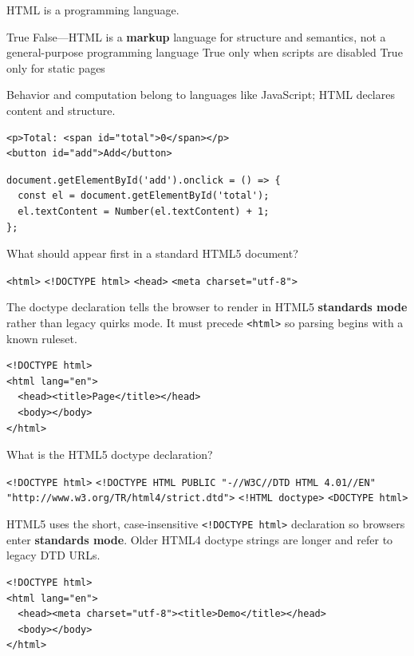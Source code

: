 \newpage


\question[4]
HTML is a programming language.
\begin{choices}
  \choice True
  \CorrectChoice False---HTML is a \textbf{markup} language for structure and semantics, not a general-purpose programming language
  \choice True only when scripts are disabled
  \choice True only for static pages
\end{choices}
\begin{solution}
  Behavior and computation belong to languages like JavaScript; HTML declares content and structure.
\begin{lstlisting}[style=htmlinline]
<p>Total: <span id="total">0</span></p>
<button id="add">Add</button>
\end{lstlisting}
\begin{lstlisting}[style=js]
document.getElementById('add').onclick = () => {
  const el = document.getElementById('total');
  el.textContent = Number(el.textContent) + 1;
};
\end{lstlisting}
\end{solution}

\question[4]
What should appear first in a standard HTML5 document?
\begin{choices}
  \choice \texttt{<html>}
  \CorrectChoice \texttt{<!DOCTYPE html>}
  \choice \texttt{<head>}
  \choice \texttt{<meta charset="utf-8">}
\end{choices}
\begin{solution}
  The doctype declaration tells the browser to render in HTML5 \textbf{standards mode} rather than legacy quirks mode. It must precede \texttt{<html>} so parsing begins with a known ruleset.
\begin{lstlisting}[style=htmlinline]
<!DOCTYPE html>
<html lang="en">
  <head><title>Page</title></head>
  <body></body>
</html>
\end{lstlisting}
\end{solution}

\question[4]
What is the HTML5 doctype declaration?
\begin{choices}
  \CorrectChoice \texttt{<!DOCTYPE html>}
  \choice \texttt{<!DOCTYPE HTML PUBLIC "-//W3C//DTD HTML 4.01//EN" "http://www.w3.org/TR/html4/strict.dtd">}
  \choice \texttt{<!HTML doctype>}
  \choice \texttt{<DOCTYPE html>}
\end{choices}
\begin{solution}
  HTML5 uses the short, case-insensitive \texttt{<!DOCTYPE html>} declaration so browsers enter \textbf{standards mode}. Older HTML4 doctype strings are longer and refer to legacy DTD URLs.
\begin{lstlisting}[style=htmlinline]
<!DOCTYPE html>
<html lang="en">
  <head><meta charset="utf-8"><title>Demo</title></head>
  <body></body>
</html>
\end{lstlisting}
\end{solution}




